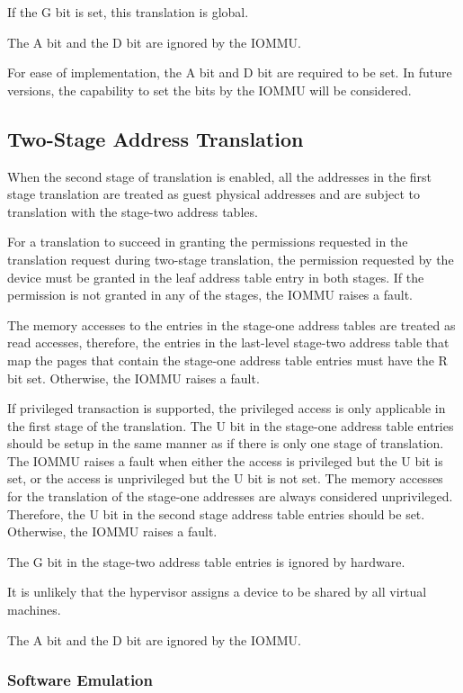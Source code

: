 If the G bit is set, this translation is global.

The A bit and the D bit are ignored by the IOMMU.

\note For ease of implementation, the A bit and D bit are required to be set. In future
versions, the capability to set the bits by the IOMMU will be considered. \noteend

\subsection{Two-Stage Address Translation}

When the second stage of translation is enabled, all the addresses in the first stage
translation are treated as guest physical addresses and are subject to translation with
the stage-two address tables.

For a translation to succeed in granting the permissions requested in the translation
request during two-stage translation, the permission requested by the device must be
granted in the leaf address table entry in both stages. If the permission is not granted
in any of the stages, the IOMMU raises a fault.

The memory accesses to the entries in the stage-one address tables are treated as read
accesses, therefore, the entries in the last-level stage-two address table that map the
pages that contain the stage-one address table entries must have the R bit set. Otherwise,
the IOMMU raises a fault.

If privileged transaction is supported, the privileged access is only applicable in the
first stage of the translation. The U bit in the stage-one address table entries should be
setup in the same manner as if there is only one stage of translation. The IOMMU raises a
fault when either the access is privileged but the U bit is set, or the access is
unprivileged but the U bit is not set. The memory accesses for the translation of the
stage-one addresses are always considered unprivileged.  Therefore, the U bit in the
second stage address table entries should be set. Otherwise, the IOMMU raises a fault.

The G bit in the stage-two address table entries is ignored by hardware.

\note It is unlikely that the hypervisor assigns a device to be shared by all virtual
machines. \noteend

The A bit and the D bit are ignored by the IOMMU.

\subsubsection{Software Emulation}

